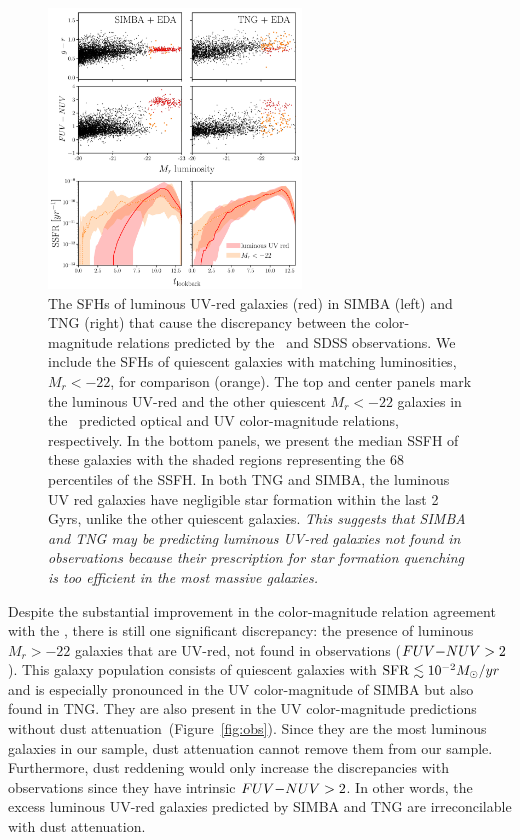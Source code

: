 \begin{figure}
\begin{center}
    \includegraphics[width=0.6\textwidth]{figs/abc_observables_uvred.pdf}
    \caption{\label{fig:uv_sfh}
    The SFHs of luminous UV-red galaxies (red) in SIMBA (left) and TNG
    (right) that cause the discrepancy between the color-magnitude
    relations predicted by the \eda~and SDSS observations. 
    We include the SFHs of quiescent galaxies with matching luminosities, 
    $M_r < -22$, for comparison (orange). 
    The top and center panels mark the luminous UV-red and the other
    quiescent $M_r < -22$ galaxies in the \eda~predicted optical and UV
    color-magnitude relations, respectively. 
    In the bottom panels, we present the median SSFH of these galaxies 
    with the shaded regions representing the 68 percentiles of the SSFH. 
    In both TNG and SIMBA, the luminous UV red galaxies have negligible
    star formation within the last 2 Gyrs, unlike the other quiescent
    galaxies. 
    \emph{This suggests that SIMBA and TNG may be predicting luminous
    UV-red galaxies not found in observations because their
    prescription for star formation quenching is too efficient in the
    most massive galaxies.}
    }
\end{center}
\end{figure}

Despite the substantial improvement in the color-magnitude relation
agreement with the \eda, there is still one significant discrepancy: the
presence of luminous $M_r > -22$ galaxies that are UV-red, not found in
observations ($FUV{-}NUV > 2$). 
This galaxy population consists of quiescent galaxies with
${\rm SFR}\lesssim 10^{-2}M_\odot/yr$ and is especially pronounced in the UV
color-magnitude of SIMBA but also found in TNG. 
They are also present in the UV color-magnitude predictions without dust
attenuation~(Figure~\ref{fig:obs}). 
Since they are the most luminous galaxies in our sample, dust attenuation
cannot remove them from our sample. 
Furthermore, dust reddening would only increase the discrepancies with
observations since they have intrinsic $FUV{-}NUV > 2$.
In other words, the excess luminous UV-red galaxies predicted by SIMBA and
TNG are irreconcilable with dust attenuation. 

